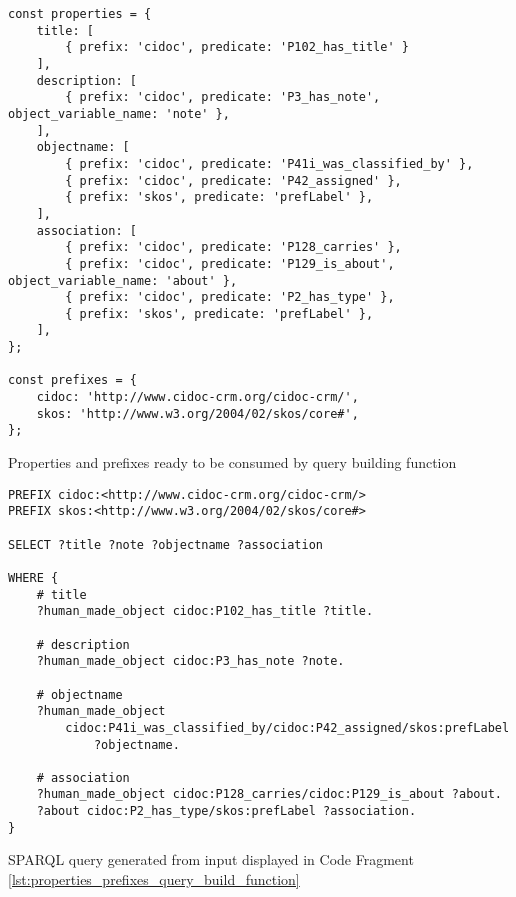 %
%
%
\begin{listing}[htbp]
    \begin{verbatim}
const properties = {
    title: [
        { prefix: 'cidoc', predicate: 'P102_has_title' }
    ],
    description: [
        { prefix: 'cidoc', predicate: 'P3_has_note', object_variable_name: 'note' },
    ],
    objectname: [
        { prefix: 'cidoc', predicate: 'P41i_was_classified_by' },
        { prefix: 'cidoc', predicate: 'P42_assigned' },
        { prefix: 'skos', predicate: 'prefLabel' },
    ],
    association: [
        { prefix: 'cidoc', predicate: 'P128_carries' },
        { prefix: 'cidoc', predicate: 'P129_is_about', object_variable_name: 'about' },
        { prefix: 'cidoc', predicate: 'P2_has_type' },
        { prefix: 'skos', predicate: 'prefLabel' },
    ],
};

const prefixes = {
    cidoc: 'http://www.cidoc-crm.org/cidoc-crm/',
    skos: 'http://www.w3.org/2004/02/skos/core#',
};
    \end{verbatim}
    \caption{Properties and prefixes ready to be consumed by query building function}
    \label{lst:properties_prefixes_query_build_function}
\end{listing}
\begin{listing}[htbp]
    \begin{verbatim}
PREFIX cidoc:<http://www.cidoc-crm.org/cidoc-crm/>
PREFIX skos:<http://www.w3.org/2004/02/skos/core#>

SELECT ?title ?note ?objectname ?association

WHERE {
    # title
    ?human_made_object cidoc:P102_has_title ?title.
    
    # description
    ?human_made_object cidoc:P3_has_note ?note.
    
    # objectname
    ?human_made_object
        cidoc:P41i_was_classified_by/cidoc:P42_assigned/skos:prefLabel
            ?objectname.
    
    # association
    ?human_made_object cidoc:P128_carries/cidoc:P129_is_about ?about.
    ?about cidoc:P2_has_type/skos:prefLabel ?association.
}
    \end{verbatim}
    \caption{SPARQL query generated from input displayed in Code Fragment \ref{lst:properties_prefixes_query_build_function}}
    \label{lst:query_generated_edge_cases}
\end{listing}



